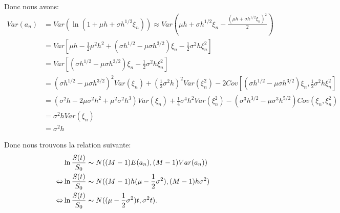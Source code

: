\documentclass[a4paper,10pt]{report}
\begin{document}
\par Donc nous avons:
\begin{align*}
	Var(a_{n}) &= Var(\ln (1 + \mu h + \sigma h^{1/2} \xi_{n})) \approx Var (\mu h +\sigma h^{1/2} \xi_{n} - \frac{(\mu h + \sigma h^{1/2} \xi_{n})^{2}}{2}) \\
	&= Var[\mu h - \frac{1}{2} \mu^{2} h^{2} + (\sigma h^{1/2} - \mu \sigma h^{3/2})\xi_{n} - \frac{1}{2} \sigma^{2} h \xi_{n}^{2}] \\
	&= Var[(\sigma h^{1/2} - \mu \sigma h^{3/2})\xi_{n} - \frac{1}{2} \sigma^{2} h \xi_{n}^{2}]\\
	&= (\sigma h^{1/2} - \mu \sigma h^{3/2})^{2} Var(\xi_{n}) + (\frac{1}{2} \sigma^{2} h)^{2} Var(\xi_{n}^{2}) - 2Cov[(\sigma h^{1/2} - \mu \sigma h^{3/2})\xi_{n}, \frac{1}{2} \sigma^{2} h \xi_{n}^{2}] \\
	&= (\sigma^{2} h - 2\mu \sigma^{2} h^{2} + \mu^{2} \sigma^{2} h^{3}) Var(\xi_{n}) + \frac{1}{4} \sigma^{4} h^{2} Var(\xi_{n}^{2}) -(\sigma^{3} h^{3/2} - \mu \sigma^{3} h^{5/2}) Cov(\xi_{n}, \xi_{n}^{2}) \\
	&= \sigma^{2} h Var(\xi_{n}) \\
	&= \sigma^{2} h
\end{align*}
\par Donc nous trouvons la relation suivante:
\begin{align*}
	 &\ln \frac{S(t)}{S_{0}} \thicksim N((M-1)E(a_{n}), (M-1)Var(a_{n})) \\
	 \Leftrightarrow &\ln \frac{S(t)}{S_{0}} \thicksim N((M-1) h(\mu - \frac{1}{2} \sigma^{2}), (M-1) h \sigma^{2}) \\
	 \Leftrightarrow &\ln \frac{S(t)}{S_{0}} \thicksim N((\mu - \frac{1}{2} \sigma^{2}) t, \sigma^{2} t).	
\end{align*}
\end{document}

